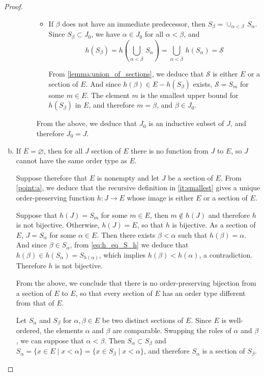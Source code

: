 \documentclass[11pt,a4paper,twoside]{article}
\theoremstyle{definition}
\begin{document}
\begin{proof}
\begin{enumerate}[(a)]
\begin{description}
\begin{itemize}
      \item If $\beta$ does not have an immediate predecessor, then $S_\beta = \cup_{\alpha < \beta} \,S_\alpha$. Since $S_\beta \subset J_0$,
        we have $\alpha \in J_0$ for all $\alpha < \beta$, and
        \begin{equation*}
          h ( S_\beta ) = h \left( \bigcup_{\alpha < \beta} \,S_\alpha \right) = \bigcup_{\alpha < \beta} \,h ( S_\alpha ) = \mathscr{S}
        \end{equation*}

        From \cref{lemma:union_of_sections}, we deduce that $\mathscr{S}$ is either $E$ or a section of $E$. And since
        $h ( \beta ) \in E - h ( S_\beta )$ exists, $\mathscr{S} = S_m$ for some $m \in E$. The element $m$ is the smallest
        upper bound for $h ( S_\beta )$ in $E$, and therefore $m = \beta$, and $\beta \in J_0$.

      \end{itemize}
      From the above, we deduce that $J_0$ is an inductive subset of $J$, and therefore $J_0 = J$.

    \end{description}

  \item If $E = \varnothing$, then for all $J$ section of $E$ there is no function from $J$ to $E$, so $J$ cannot have the
    same order type as $E$.

    Suppose therefore that $E$ is nonempty and let $J$ be a section of $E$. From \cref{point:a}, we deduce that
    the recursive definition in \ref{it:smallest} gives a unique order-preserving function $h : J \to E$ whose image is
    either $E$ or a section of $E$.

    Suppose that $h ( J ) = S_m$ for some $m \in E$, then $m \notin h ( J )$ and therefore $h$ is not bijective.
    Otherwise, $h ( J ) = E$, so that $h$ is bijective. As a section of $E$, $J = S_\alpha$ for some $\alpha \in E$.
    Then there exists $\beta < \alpha$ such that $h ( \beta ) = \alpha$. And since $\beta \in S_\alpha$, from \eqref{eq:h_eq_S_h}
    we deduce that $h ( \beta ) \in h ( S_\alpha ) = S_{ h ( \alpha ) }$, which implies $h ( \beta ) < h ( \alpha )$,
    a contradiction. Therefore $h$ is not bijective.

    From the above, we conclude that there is no order-preserving bijection from a section of $E$ to $E$, so that
    every section of $E$ has an order type different from that of $E$.

    Let $S_\alpha$ and $S_\beta$ for $\alpha, \beta \in E$ be two distinct sections of $E$. Since $E$ is well-ordered,
    the elements $\alpha$ and $\beta$ are comparable. Swapping the roles of $\alpha$ and $\beta$, we can suppose that
    $\alpha < \beta$. Then $S_\alpha \subset S_\beta$ and $S_\alpha = \{ x \in E \mid x < \alpha \} = \{ x \in S_\beta \mid x < \alpha \}$,
    and therefore $S_\alpha$ is a section of $S_\beta$.


\end{enumerate}
\end{proof}
\end{document}
